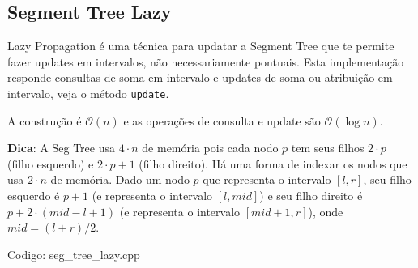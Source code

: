 \documentclass[10pt, a4paper, oneside]{book}
\begin{document}
\subsection{Segment Tree Lazy}


Lazy Propagation é uma técnica para updatar a Segment Tree que te permite fazer updates em intervalos, não necessariamente pontuais. Esta implementação responde consultas de soma em intervalo e updates de soma ou atribuição em intervalo, veja o método \texttt{update}.



A construção é $\mathcal{O}(n)$ e as operações de consulta e update são $\mathcal{O}(\log n)$.



\textbf{Dica}: A Seg Tree usa $4 \cdot n$ de memória pois cada nodo $p$ tem seus filhos $2 \cdot p$ (filho esquerdo) e $2 \cdot p + 1$ (filho direito). Há uma forma de indexar os nodos que usa $2 \cdot n$ de memória. Dado um nodo $p$ que representa o intervalo $[l, r]$, seu filho esquerdo é $p+1$ (e representa o intervalo $[l, mid]$) e seu filho direito é $p+2 \cdot (mid-l+1)$ (e representa o intervalo $[mid+1, r]$), onde $mid = (l+r)/2$.
\hfill

Codigo: seg\_tree\_lazy.cpp
\end{document}
